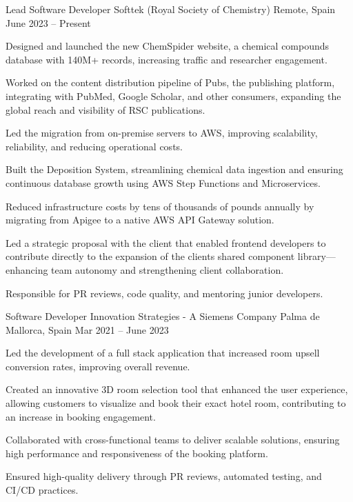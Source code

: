 \documentclass[]{awesome-cv}
\begin{document}
\begin{cventries}
	\cventry
	{Lead Software Developer}
	{Softtek (Royal Society of Chemistry)}
	{Remote, Spain}
	{June 2023 – Present}
	{\begin{cvitems}
		\vspace{0.5mm}
		\item {Designed and launched the new ChemSpider website, a chemical compounds database with  140M+ records, increasing traffic and researcher engagement.}
		\item {Worked on the content distribution pipeline of Pubs, the publishing platform, integrating with PubMed, Google Scholar, and other consumers, expanding the global reach and visibility of RSC publications.}
		\item {Led the migration from on-premise servers to AWS, improving scalability, reliability, and reducing operational costs.}
		\item {Built the Deposition System, streamlining chemical data ingestion and ensuring continuous database growth using AWS Step Functions and Microservices.}
		\item {Reduced infrastructure costs by tens of thousands of pounds annually by migrating from Apigee to a native AWS API Gateway solution.}
		\item {Led a strategic proposal with the client that enabled frontend developers to contribute directly to the expansion of the client\textquotesingle{}s shared component library—enhancing team autonomy and strengthening client collaboration.}
		\item {Responsible for PR reviews, code quality, and mentoring junior developers.}
		\end{cvitems}}

	\cventry
	{Software Developer}
	{Innovation Strategies - A Siemens Company}
	{Palma de Mallorca, Spain}
	{Mar 2021 – June 2023}
	{\begin{cvitems}
		\vspace{0.5mm}
		\item {Led the development of a full stack application that increased room upsell conversion rates, improving overall revenue.}
		\item {Created an innovative 3D room selection tool that enhanced the user experience, allowing customers to visualize and book their exact hotel room, contributing to an increase in booking engagement.}
		\item {Collaborated with cross-functional teams to deliver scalable solutions, ensuring high performance and responsiveness of the booking platform.}
		\item {Ensured high-quality delivery through PR reviews, automated testing, and CI/CD practices.}
		\end{cvitems}}
\end{cventries}
\end{document}
